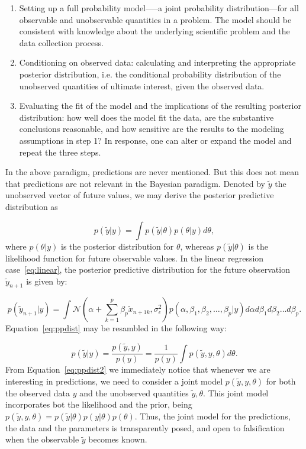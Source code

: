 \documentclass{statsoc}
\begin{document}
\begin{enumerate}
\item Setting up a full probability model—--a joint probability distribution---for all observable and unobservable quantities 
           in a problem. The model should be consistent with knowledge about the underlying scientific problem and the data collection 
           process.
\item Conditioning on observed data: calculating and interpreting the appropriate posterior distribution, i.e. the conditional probability 
           distribution of the unobserved quantities of ultimate interest, given the observed data.
\item Evaluating the fit of the model and the implications of the resulting posterior distribution: how well does the model fit the 
           data, are the substantive conclusions reasonable, and how sensitive are the results to the modeling assumptions in step 1? 
           In response, one can alter or expand the model and repeat the three steps.
\end{enumerate}
%
In the above paradigm, predictions are never mentioned. But this does not mean that predictions are not relevant in the Bayesian paradigm. Denoted by $\tilde{y}$ the unobserved vector of future values, we may derive the posterior predictive distribution as

\begin{equation}
p(\tilde{y}|y) = \int p(\tilde{y}|\theta)p(\theta|y) d\theta,
\label{eq:ppdist}
\end{equation}
%
where $p(\theta|y)$ is the posterior distribution for $\theta$, whereas $p(\tilde{y}|\theta)$ is the likelihood function for future observable values. In the linear regression case~\eqref{eq:linear}, the posterior predictive distribution for the future observation $\tilde{y}_{n+1}$ is given by:

$$ p(\tilde{y}_{n+1}|y)= \int \mathcal{N}(\alpha+\sum_{k=1}^{p}\beta_p \tilde{x}_{n+1k}, \sigma^2_{\epsilon}) p(\alpha, \beta_1, \beta_2,\ldots,\beta_p|y) d\alpha  d\beta_1 d\beta_2\ldots d\beta_p.$$
%
Equation~\eqref{eq:ppdist} may be resambled in the following way:

\begin{equation}
p(\tilde{y}|y) = \frac{p(\tilde{y},y)}{p(y)}= \frac{1}{p(y)}\int p(\tilde{y},y,\theta)d\theta.
\label{eq:ppdist2}
\end{equation}
%
From Equation~\eqref{eq:ppdist2} we immediately notice that whenever we are interesting in predictions, we need to consider a joint model $p(\tilde{y},y,\theta)$ for both the observed data $y$ and the unobserved quantities $\tilde{y},\theta$. This joint model incorporates bot the likelihood and the prior, being $p(\tilde{y},y,\theta) = p(\tilde{y}|\theta)p(y|\theta)p(\theta)$. Thus, the joint model for the predictions, the data and the parameters is transparently posed, and open to falsification when the observable $\tilde{y}$ becomes known.
\end{document}
